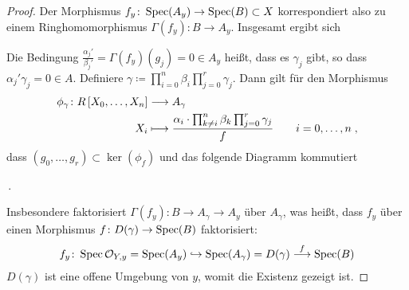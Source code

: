 \begin{Lemma}
\begin{proof}
    Der Morphismus ${f_y\colon\operatorname{Spec}(A_y)\to\operatorname{Spec}(B)\subset X}$
    korrespondiert also zu einem Ringhomomorphismus
    ${\Gamma(f_y)\colon B\to A_y}$.
    Insgesamt ergibt sich
    \begin{center}
    \end{center}
    Die Bedingung $\frac{\alpha_j'}{\beta_j'}=\Gamma(f_y)(g_j)=0\in A_y$
    heißt, dass es $\gamma_j$ gibt, so dass
    $\alpha_j'\gamma_j=0\in A$.
    Definiere
    $\gamma\coloneqq \prod_{i=0}^n \beta_i \prod_{j=0}^r \gamma_j$.
    Dann gilt für den Morphismus
    \begin{align*}
      \phi_\gamma\colon
      R\left[X_0,\dotsc, X_n\right]
      &\longto
        A_\gamma\\
      X_i
      &\longmapsto
        \dfrac{
        \alpha_i\cdot
        \prod_{k\neq i}^n \beta_k
        \prod_{j=0}^r \gamma_j
        }{f}
        \qquad i=0,\dotsc,n\;,
    \end{align*}
    dass $(g_0, \dotsc, g_r)\subset\ker(\phi_f)$ und das folgende
    Diagramm kommutiert
    \begin{center}
      \,.
    \end{center}
    Insbesondere faktorisiert ${\Gamma(f_y)\colon B\to A_\gamma\to A_y}$
    über $A_\gamma$, was heißt, dass $f_y$ über einen Morphismus
    ${f\colon D(\gamma)\to\operatorname{Spec}(B)}$ faktorisiert:
    \begin{gather*}
      f_y\colon
      \operatorname{Spec}\mathcal{O}_{Y,y}=\operatorname{Spec}(A_y)
      \hookrightarrow \operatorname{Spec}(A_\gamma)=D(\gamma)
      \overset{f}{\longrightarrow} \operatorname{Spec}(B)
    \end{gather*}
    $D(\gamma)$ ist eine offene Umgebung von $y$, womit die Existenz
    gezeigt ist.
  \end{proof}
\end{Lemma}


